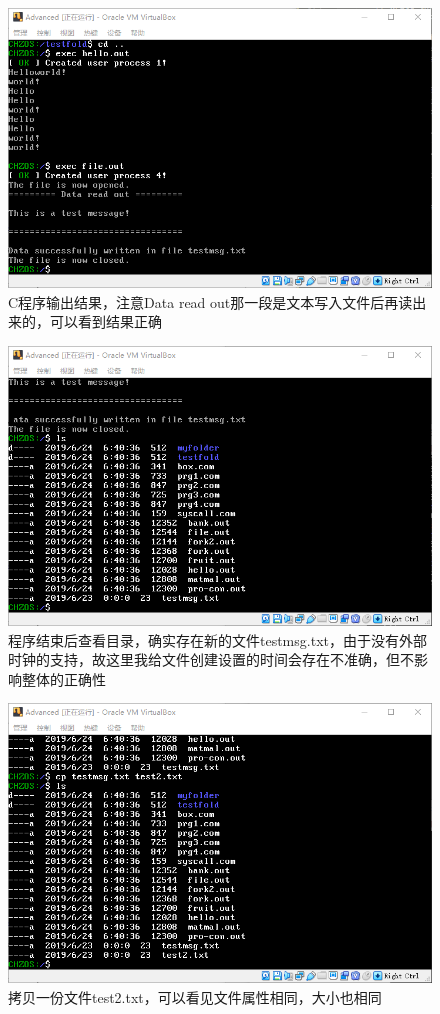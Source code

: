 \documentclass[logo,reportComp]{thesis}
\begin{document}
\begin{figure}[H]
\centering
\includegraphics[width=0.8\linewidth]{fig/cfile.png}
\caption{C程序输出结果，注意Data read out那一段是文本写入文件后再读出来的，可以看到结果正确}
\label{fig:cfile}
\end{figure}
\begin{figure}[H]
\centering
\includegraphics[width=0.8\linewidth]{fig/cfile-ls.png}
\caption{程序结束后查看目录，确实存在新的文件testmsg.txt，由于没有外部时钟的支持，故这里我给文件创建设置的时间会存在不准确，但不影响整体的正确性}
\label{fig:testmsg}
\end{figure}
\begin{figure}[H]
\centering
\includegraphics[width=0.8\linewidth]{fig/cfile-cp.png}
\caption{拷贝一份文件test2.txt，可以看见文件属性相同，大小也相同}
\label{fig:cfile-cp}
\end{figure}
\end{document}
